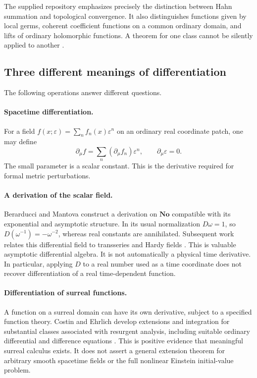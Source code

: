 \documentclass[11pt,letterpaper]{article}
\newcommand{\No}{\mathbf{No}}
\newcommand{\eps}{\varepsilon}
\theoremstyle{definition}
\theoremstyle{remark}
\begin{document}
The supplied repository emphasizes precisely the distinction between Hahn
summation and topological convergence. It also distinguishes functions given
by local germs, coherent coefficient functions on a common ordinary domain,
and lifts of ordinary holomorphic functions. A theorem for one class cannot
be silently applied to another \cite{RepoDocs,RepoAnalysis}.

\subsection{Three different meanings of differentiation}

The following operations answer different questions.

\paragraph{Spacetime differentiation.}
For a field $f(x;\eps)=\sum_n f_n(x)\eps^n$ on an ordinary real coordinate
patch, one may define
\[
 \partial_\mu f=\sum_n (\partial_\mu f_n)\eps^n,
 \qquad \partial_\mu\eps=0.
\]
The small parameter is a scalar constant. This is the derivative required for
formal metric perturbations.

\paragraph{A derivation of the scalar field.}
Berarducci and Mantova construct a derivation on $\No$ compatible with its
exponential and asymptotic structure. In its usual normalization $D\omega=1$,
so $D(\omega^{-1})=-\omega^{-2}$, whereas real constants are annihilated.
Subsequent work relates this differential field to transseries and Hardy fields
\cite{BerarducciMantova,ADH}. This is valuable asymptotic differential algebra.
It is not automatically a physical time derivative. In particular, applying
$D$ to a real number used as a time coordinate does not recover differentiation
of a real time-dependent function.

\paragraph{Differentiation of surreal functions.}
A function on a surreal domain can have its own derivative, subject to a
specified function theory. Costin and Ehrlich develop extensions and integration
for substantial classes associated with resurgent analysis, including suitable
ordinary differential and difference equations \cite{CostinEhrlich}. This is
positive evidence that meaningful surreal calculus exists. It does not assert
a general extension theorem for arbitrary smooth spacetime fields or the full
nonlinear Einstein initial-value problem.
\end{document}
